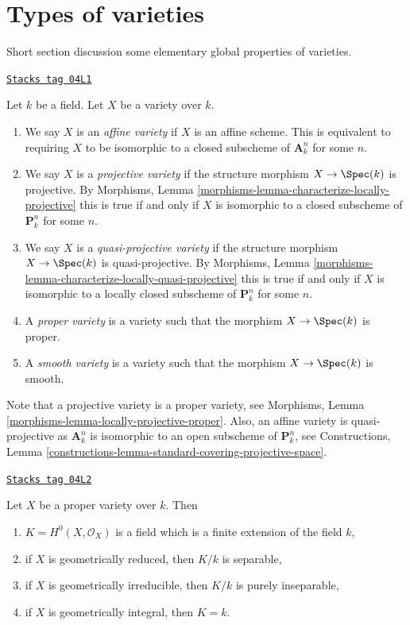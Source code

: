 \section{Types of varieties}
\label{varieties-section-types}
Short section discussion some elementary global properties of varieties.

\begin{definition}
\label{varieties-definition-variety-type}
\href{https://stacks.math.columbia.edu/tag/04L1}{\texttt{Stacks tag 04L1}}

Let $k$ be a field. Let $X$ be a variety over $k$.
\begin{enumerate}
\item We say $X$ is an {\it affine variety} if $X$ is an affine scheme.
This is equivalent to requiring $X$ to be isomorphic to a closed
subscheme of $\mathbf{A}^n_k$ for some $n$.
\item We say $X$ is a {\it projective variety} if the
structure morphism $X \to \Spec(k)$ is projective. By
Morphisms, Lemma \ref{morphisms-lemma-characterize-locally-projective}
this is true if and only if $X$ is isomorphic to a closed
subscheme of $\mathbf{P}^n_k$ for some $n$.
\item We say $X$ is a {\it quasi-projective variety} if
the structure morphism $X \to \Spec(k)$ is quasi-projective. By
Morphisms, Lemma \ref{morphisms-lemma-characterize-locally-quasi-projective}
this is true if and only if $X$ is isomorphic to a
locally closed subscheme of $\mathbf{P}^n_k$ for some $n$.
\item A {\it proper variety} is a variety such that the
morphism $X \to \Spec(k)$ is proper.
\item A {\it smooth variety} is a variety such that the
morphism $X \to \Spec(k)$ is smooth.
\end{enumerate}
\end{definition}

Note that a projective variety is a proper variety, see
Morphisms, Lemma \ref{morphisms-lemma-locally-projective-proper}.
Also, an affine variety is quasi-projective as $\mathbf{A}^n_k$
is isomorphic to an open subscheme of $\mathbf{P}^n_k$, see
Constructions,
Lemma \ref{constructions-lemma-standard-covering-projective-space}.

\begin{lemma}
\label{varieties-lemma-regular-functions-proper-variety}
\href{https://stacks.math.columbia.edu/tag/04L2}{\texttt{Stacks tag 04L2}}

Let $X$ be a proper variety over $k$. Then
\begin{enumerate}
\item $K = H^0(X, \mathcal{O}_X)$ is a field which is
a finite extension of the field $k$,
\item if $X$ is geometrically reduced, then $K/k$ is separable,
\item if $X$ is geometrically irreducible, then $K/k$
is purely inseparable,
\item if $X$ is geometrically integral, then $K = k$.
\end{enumerate}
\end{lemma}

